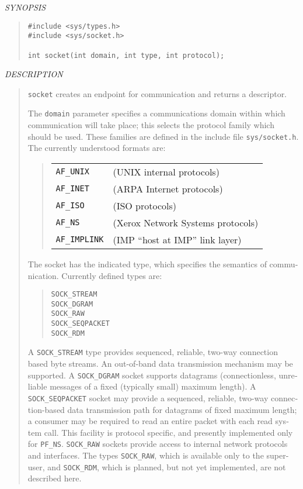 \begin{appendix}
\begin{english}
{\sl SYNOPSIS}
\begin{quote}
\begin{verbatim}
#include <sys/types.h>
#include <sys/socket.h>

int socket(int domain, int type, int protocol);
\end{verbatim}
\end{quote}

{\sl DESCRIPTION}
\begin{quote}
	{\tt socket} creates an endpoint for communication and returns a
	descriptor.

	The {\tt domain} parameter specifies a communications domain within 
	which communication will take place; this selects the protocol
	family which should be used. These families are defined in the
	include file {\tt sys/socket.h}. The currently understood formats are:
	\begin{quote}
	\begin{tabular}{lp{5cm}}
		{\tt AF\_UNIX}		&	(UNIX internal protocols)\\
		{\tt AF\_INET}		&	(ARPA Internet protocols)\\
		{\tt AF\_ISO}		&	(ISO protocols)\\
		{\tt AF\_NS}			&	(Xerox Network Systems protocols)\\
		{\tt AF\_IMPLINK}	&	(IMP ``host at IMP'' link layer)
	\end{tabular}
	\end{quote}

	The socket has the indicated type, which specifies the semantics of
	communication. Currently defined types are:
	\begin{quote}
		{\tt SOCK\_STREAM}\\
		{\tt SOCK\_DGRAM}\\
		{\tt SOCK\_RAW}\\
		{\tt SOCK\_SEQPACKET}\\
		{\tt SOCK\_RDM}
	\end{quote}
	
	A {\tt SOCK\_STREAM} type provides sequenced, reliable, two-way connection
	based byte streams. An out-of-band data transmission mechanism 
	may be supported. A {\tt SOCK\_DGRAM} socket supports datagrams
	(connectionless, unreliable messages of a fixed (typically small)
	maximum length). A {\tt SOCK\_SEQPACKET} socket may provide a sequenced, 
	reliable, two-way connection-based data transmission path for
	datagrams of fixed maximum length; a consumer may be required to 
	read an entire packet with each read system call. This facility is
	protocol specific, and presently implemented only for {\tt PF\_NS}. 
	{\tt SOCK\_RAW} sockets provide access to internal network protocols and 
	interfaces. The types {\tt SOCK\_RAW}, which is available only to the
	super-user, and {\tt SOCK\_RDM}, which is planned, but not yet 
	implemented, are not described here.


\end{quote}
\end{english}
\end{appendix}

